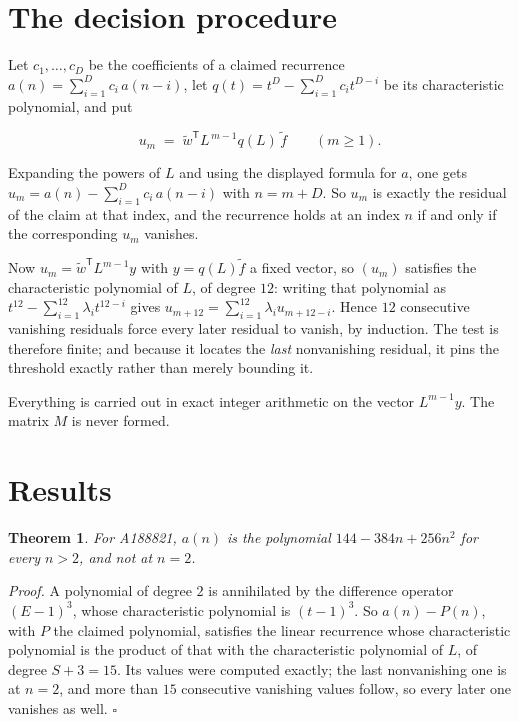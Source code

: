 \documentclass[11pt]{article}
\newtheorem{theorem}{Theorem}
\theoremstyle{definition}
\begin{document}
\section{The decision procedure}

Let $c_1,\dots,c_D$ be the coefficients of a claimed recurrence $a(n) = \sum_{i=1}^{D} c_i\,a(n-i)$, let $q(t) = t^{D} - \sum_{i=1}^{D} c_i t^{D-i}$ be its characteristic polynomial, and put

\[u_m \;=\; \tilde w^{\mathsf T} L^{\,m-1} q(L)\,\tilde f \qquad (m \ge 1).\]

Expanding the powers of $L$ and using the displayed formula for $a$, one gets $u_m = a(n) - \sum_{i=1}^{D} c_i\,a(n-i)$ with $n = m + D$. So $u_m$ is exactly the residual of the claim at that index, and the recurrence holds at an index $n$ if and only if the corresponding $u_m$ vanishes.

Now $u_m = \tilde w^{\mathsf T} L^{m-1} y$ with $y = q(L)\tilde f$ a fixed vector, so $(u_m)$ satisfies the characteristic polynomial of $L$, of degree $12$: writing that polynomial as $t^{12} - \sum_{i=1}^{12} \lambda_i t^{12-i}$ gives $u_{m+12} = \sum_{i=1}^{12} \lambda_i u_{m+12-i}$. Hence $12$ consecutive vanishing residuals force every later residual to vanish, by induction. The test is therefore finite; and because it locates the {\itshape last} nonvanishing residual, it pins the threshold exactly rather than merely bounding it.

Everything is carried out in exact integer arithmetic on the vector $L^{m-1}y$. The matrix $M$ is never formed.

\section{Results}

\begin{theorem} For A188821, $a(n)$ is the polynomial $144 - 384n + 256n^{2}$ for every $n > 2$, and not at $n = 2$.\end{theorem}

{\itshape Proof.} A polynomial of degree $2$ is annihilated by the difference operator $(E-1)^{3}$, whose characteristic polynomial is $(t-1)^{3}$. So $a(n) - P(n)$, with $P$ the claimed polynomial, satisfies the linear recurrence whose characteristic polynomial is the product of that with the characteristic polynomial of $L$, of degree $S + 3 = 15$. Its values were computed exactly; the last nonvanishing one is at $n = 2$, and more than $15$ consecutive vanishing values follow, so every later one vanishes as well. $\square$
\end{document}
